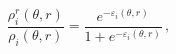 \begin{equation}
\frac{\rho _{i}^{r}(\theta ,r)}{\rho _{i}(\theta ,r)}=\frac{e^{-\varepsilon
_{i}(\theta ,r)}}{1+e^{-\varepsilon _{i}(\theta ,r)}}\,,  \label{dens}
\end{equation}%
